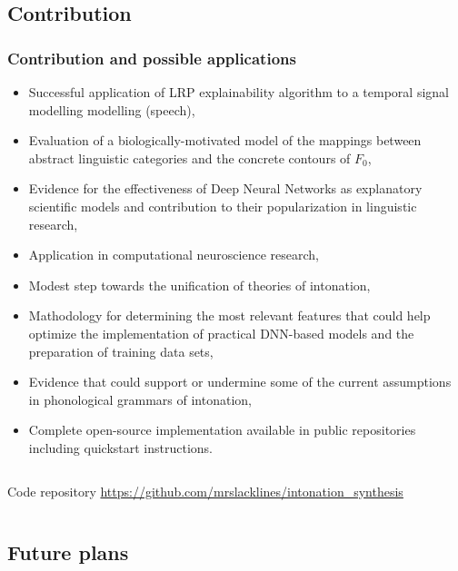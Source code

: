 \documentclass[a4paper,9pt]{beamer}
\theoremstyle{mytheoremstyle}
\begin{document}
\subsection{Contribution}

\begin{frame}
\frametitle{Contribution and possible applications}
\scriptsize{
\begin{exampleblock}{}
\begin{itemize}
\item[\checkmark] Successful application of LRP explainability algorithm to a temporal signal modelling modelling (speech),
\item[\checkmark] Evaluation of a biologically-motivated model of the mappings between abstract linguistic categories and the concrete contours of $F_{0}$,
\item[\checkmark] Evidence for the effectiveness of Deep Neural Networks as explanatory scientific models and contribution to their popularization in linguistic research,
\item[\checkmark] Application in computational neuroscience research,
\item[\checkmark] Modest step towards the unification of theories of intonation,
\item[\checkmark] Mathodology for determining the most relevant features that could help optimize the implementation of practical DNN-based models and the preparation of training data sets,
\item[\checkmark] Evidence that could support or undermine some of the current assumptions in phonological grammars of intonation,
\item[\checkmark] Complete open-source implementation available in public repositories including quickstart instructions.
\end{itemize}
\end{exampleblock}
}
\begin{columns}
\scriptsize{
\begin{exampleblock}{Code repository}
\url{https://github.com/mrslacklines/intonation_synthesis}
\end{exampleblock}
}
\end{columns}
\end{frame}

\subsection{Future plans}
\end{document}
